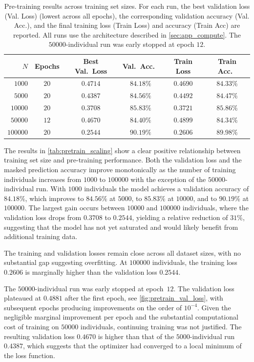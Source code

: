 \begin{table}[H]
\centering
\caption{Pre-training results across training set sizes. For each run, the best validation loss (Val. Loss) (lowest across all epochs), the corresponding validation accuracy (Val. Acc.), and the final training loss (Train Loss) and accuracy (Train Acc) are reported. All runs use the architecture described in \autoref{sec:app_compute}. The $50000$-individual run was early stopped at epoch $12$.}
\label{tab:pretrain_scaling}
\begin{tabular}{r c c c c c}
\toprule
$N$ & Epochs & Best Val.\ Loss & Val.\ Acc.\ & Train Loss & Train Acc.\ \\
\midrule
$1000$    & $20$ & $0.4714$ & $84.18\%$ & $0.4690$ & $84.33\%$ \\
$5000$    & $20$ & $0.4387$ & $84.56\%$ & $0.4492$ & $84.47\%$ \\
$10000$   & $20$ & $0.3708$ & $85.83\%$ & $0.3721$ & $85.86\%$ \\
$50000$   & $12$ & $0.4670$ & $84.40\%$ & $0.4899$ & $84.34\%$ \\
$100000$  & $20$ & $0.2544$ & $90.19\%$ & $0.2606$ & $89.98\%$ \\
\bottomrule
\end{tabular}
\end{table}

The results in \autoref{tab:pretrain_scaling} show a clear positive relationship between training set size and pre-training performance. Both the validation loss and the masked prediction accuracy improve monotonically as the number of training individuals increases from $1000$ to $100000$ with the exception of the $50000$-individual run. With $1000$ individuals the model achieves a validation accuracy of $84.18\%$, which improves to $84.56\%$ at $5000$, to $85.83\%$ at $10000$, and to $90.19\%$ at $100000$. The largest gain occurs between $10000$ and $100000$ individuals, where the validation loss drops from $0.3708$ to $0.2544$, yielding a relative reduction of $31\%$, suggesting that the model has not yet saturated and would likely benefit from additional training data.

The training and validation losses remain close across all dataset sizes, with no substantial gap suggesting overfitting. At $100000$ individuals, the training loss $0.2606$ is marginally higher than the validation loss $0.2544$.

The $50000$-individual run was early stopped at epoch~$12$. The validation loss plateaued at $0.4881$ after the first epoch, see \autoref{fig:pretrain_val_loss}, with subsequent epochs producing improvements on the order of $10^{-4}$. Given the negligible marginal improvement per epoch and the substantial computational cost of training on $50000$ individuals, continuing training was not justified. The resulting validation loss $0.4670$ is higher than that of the $5000$-individual run $0.4387$, which suggests that the optimizer had converged to a local minimum of the loss function.


